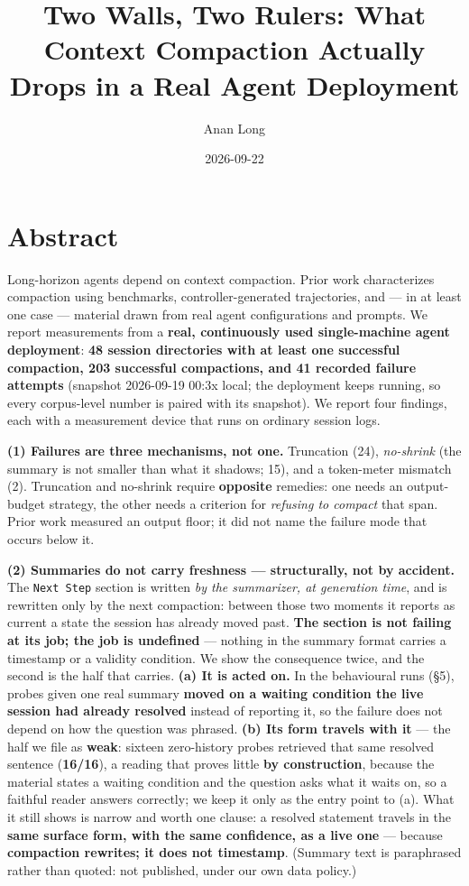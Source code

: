 \documentclass[
]{article}
\title{Two Walls, Two Rulers: What Context Compaction Actually Drops in
a Real Agent Deployment}
\author{Anan Long}
\date{2026-09-22}
\begin{document}
\maketitle

\section{Abstract}\label{abstract}

Long-horizon agents depend on context compaction. Prior work
characterizes compaction using benchmarks, controller-generated
trajectories, and --- in at least one case --- material drawn from real
agent configurations and prompts. We report measurements from a
\textbf{real, continuously used single-machine agent deployment}:
\textbf{48 session directories with at least one successful compaction,
203 successful compactions, and 41 recorded failure attempts} (snapshot
2026-09-19 00:3x local; the deployment keeps running, so every
corpus-level number is paired with its snapshot). We report four
findings, each with a measurement device that runs on ordinary session
logs.

\textbf{(1) Failures are three mechanisms, not one.} Truncation (24),
\emph{no-shrink} (the summary is not smaller than what it shadows; 15),
and a token-meter mismatch (2). Truncation and no-shrink require
\textbf{opposite} remedies: one needs an output-budget strategy, the
other needs a criterion for \emph{refusing to compact} that span. Prior
work measured an output floor; it did not name the failure mode that
occurs below it.

\textbf{(2) Summaries do not carry freshness --- structurally, not by
accident.} The \texttt{Next\ Step} section is written \emph{by the
summarizer, at generation time}, and is rewritten only by the next
compaction: between those two moments it reports as current a state the
session has already moved past. \textbf{The section is not failing at
its job; the job is undefined} --- nothing in the summary format carries
a timestamp or a validity condition. We show the consequence twice, and
the second is the half that carries. \textbf{(a) It is acted on.} In the
behavioural runs (§5), probes given one real summary \textbf{moved on a
waiting condition the live session had already resolved} instead of
reporting it, so the failure does not depend on how the question was
phrased. \textbf{(b) Its form travels with it} --- the half we file as
\textbf{weak}: sixteen zero-history probes retrieved that same resolved
sentence (\textbf{16/16}), a reading that proves little \textbf{by
construction}, because the material states a waiting condition and the
question asks what it waits on, so a faithful reader answers correctly;
we keep it only as the entry point to (a). What it still shows is narrow
and worth one clause: a resolved statement travels in the \textbf{same
surface form, with the same confidence, as a live one} --- because
\textbf{compaction rewrites; it does not timestamp}. (Summary text is
paraphrased rather than quoted: not published, under our own data
policy.)
\end{document}
